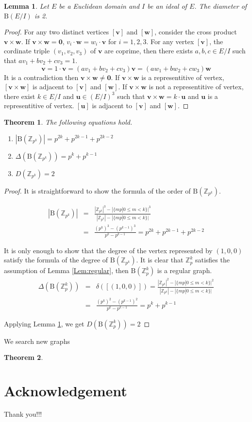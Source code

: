 \documentclass{article}
\newtheorem{Lem}{Lemma}
\newtheorem*{Th}{Theorem}
\newcommand{\Z}{\mathbb Z}
\newcommand{\B}{\mathrm{B}}
\begin{document}
\begin{Lem}\label{Lem:diameter}
Let $E$ be a Euclidean domain and $I$ be an ideal of $E$. The diameter of $\B(E/I)$ is 2.
\end{Lem}

\begin{proof}
For any two distinct vertices $[\bm v]$ and $[\bm w]$, consider the cross product $\bm v \times \bm w$. If $\bm v \times \bm w = \bm 0$, $v_i \cdot \bm w = w_i \cdot \bm v$ for $i=1,2,3$. 
For any vertex $[\bm v]$, the cordinate triple $(v_1,v_2,v_3)$ of ${\bm v}$ are coprime, then there exists $a,b,c \in E/I$ such that $a v_1 + b v_2+ c v_3 = 1$.
\[ \bm v = 1 \cdot \bm v = ( a v_1 + b v_2+ c v_3 ) \bm v = ( a w_1 + b w_2 + c w_3 ) \bm w\]
It is a contradiction then $\bm v \times \bm w \neq \bm 0$. 
If $\bm v \times \bm w$ is a representitive of vertex, $[\bm v \times \bm w]$ is adjacent to $[\bm v]$ and $[\bm w]$.
If $\bm v \times \bm w$ is not a representitive of vertex, there exist $k \in E/I$ and $\bm u \in (E/I)^3$ such that $\bm v \times \bm w = k \cdot \bm u$ and $\bm u$ is a representitive of vertex. $[\bm u]$ is adjacent to $[\bm v]$ and $[\bm w]$.
\end{proof}

\begin{Th}
The following equations hold.
\begin{enumerate}
\item $ |\B(\Z_{p^k})| = p^{2k}+p^{2k-1}+p^{2k-2} $
\item $ \Delta(\B(\Z_{p^k})) = p^k + p^{k-1} $
\item $ D(\Z_{p^k}) = 2$
\end{enumerate}
\end{Th}

\begin{proof}
It is straightforward to show the formula of the order of $\B(\Z_{p^k})$.

\begin{eqnarray*}
|\B(\Z_{p^k})| & = & \frac{|\Z_{p^k}|^3 - |\{ mp | 0 \leq m < k \}|^3}{|\Z_{p^k}|-|\{ mp | 0 \leq m < k \}|} \\ 
& = & \frac{(p^k)^3 - (p^{k-1})^3}{p^k-p^{k-1}} = p^{2k}+p^{2k-1}+p^{2k-2}
\end{eqnarray*}

It is only enough to show that the degree of the vertex represented by $(1,0,0)$ satisfy the formula of the degree of $\B(\Z_{p^k})$. 
It is clear that $\Z_p^{k}$ satisfies the assumption of Lemma \ref{Lem:regular}, then $\B(\Z_p^{k})$ is a regular graph. 
\begin{eqnarray*}
\Delta(\B(\Z_p^k)) & = & \delta([(1,0,0)]) = \frac{|\Z_{p^k}|^2 - |\{ mp | 0 \leq m < k \}|^2 }{|\Z_{p^k}|-|\{ mp | 0 \leq m < k \}|} \\
& = & \frac{(p^k)^2 - (p^{k-1})^2}{p^k-p^{k-1}} = p^k + p^{k-1}
\end{eqnarray*}

Applying Lemma \ref{Lem:diameter}, we get $D(\B(\Z_p^k)) = 2$

\end{proof}

We search new graphs 

\begin{Th}
\end{Th}

\section{Acknowledgement}
Thank you!!!
\end{document}
